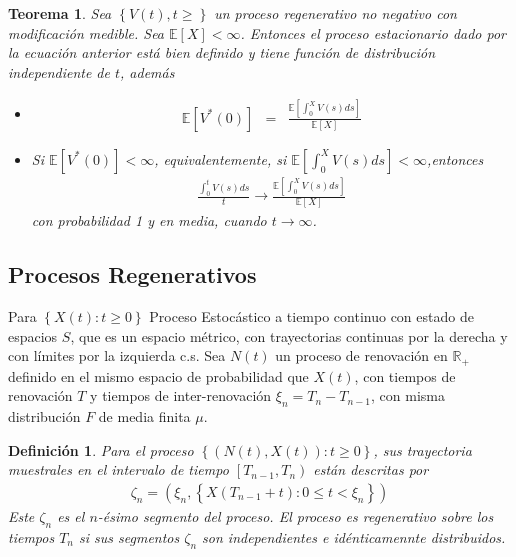 \documentclass{article}
\newtheorem{Def}{Definición}
\newtheorem{Teo}{Teorema}
\newcommand{\rea}{\mathbb{R}}
\newcommand{\esp}{\mathbb{E}}
\begin{document}
\begin{Teo}
Sea $\left\{V\left(t\right),t\geq\right\}$ un proceso regenerativo no negativo con modificaci\'on medible. Sea $\esp\left[X\right]<\infty$. Entonces el proceso estacionario dado por la ecuaci\'on anterior est\'a bien definido y tiene funci\'on de distribuci\'on independiente de $t$, adem\'as
\begin{itemize}
\item[i)] \begin{eqnarray*}
\esp\left[V^{*}\left(0\right)\right]&=&\frac{\esp\left[\int_{0}^{X}V\left(s\right)ds\right]}{\esp\left[X\right]}\end{eqnarray*}
\item[ii)] Si $\esp\left[V^{*}\left(0\right)\right]<\infty$, equivalentemente, si $\esp\left[\int_{0}^{X}V\left(s\right)ds\right]<\infty$,entonces
\begin{eqnarray*}
\frac{\int_{0}^{t}V\left(s\right)ds}{t}\rightarrow\frac{\esp\left[\int_{0}^{X}V\left(s\right)ds\right]}{\esp\left[X\right]}
\end{eqnarray*}
con probabilidad 1 y en media, cuando $t\rightarrow\infty$.
\end{itemize}
\end{Teo}

\subsection{Procesos Regenerativos}

Para $\left\{X\left(t\right):t\geq0\right\}$ Proceso Estoc\'astico a tiempo continuo con estado de espacios $S$, que es un espacio m\'etrico, con trayectorias continuas por la derecha y con l\'imites por la izquierda c.s. Sea $N\left(t\right)$ un proceso de renovaci\'on en $\rea_{+}$ definido en el mismo espacio de probabilidad que $X\left(t\right)$, con tiempos de renovaci\'on $T$ y tiempos de inter-renovaci\'on $\xi_{n}=T_{n}-T_{n-1}$, con misma distribuci\'on $F$ de media finita $\mu$.



\begin{Def}
Para el proceso $\left\{\left(N\left(t\right),X\left(t\right)\right):t\geq0\right\}$, sus trayectoria muestrales en el intervalo de tiempo $\left[T_{n-1},T_{n}\right)$ est\'an descritas por
\begin{eqnarray*}
\zeta_{n}=\left(\xi_{n},\left\{X\left(T_{n-1}+t\right):0\leq t<\xi_{n}\right\}\right)
\end{eqnarray*}
Este $\zeta_{n}$ es el $n$-\'esimo segmento del proceso. El proceso es regenerativo sobre los tiempos $T_{n}$ si sus segmentos $\zeta_{n}$ son independientes e id\'enticamennte distribuidos.
\end{Def}
\end{document}
